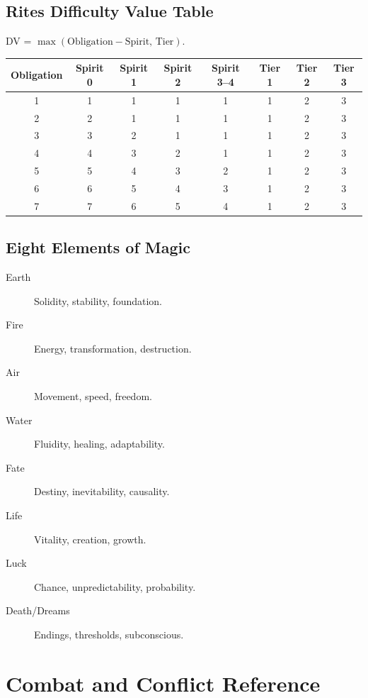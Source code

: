 \subsection{Rites Difficulty Value Table}\label{subsec:rites_dv_table}
DV = \(\max(\text{Obligation} - \text{Spirit},\, \text{Tier})\).

\begin{longtable}{c|cccc|c|c|c}
\toprule
\textbf{Obligation} & \textbf{Spirit 0} & \textbf{Spirit 1} & \textbf{Spirit 2} & \textbf{Spirit 3--4} & \textbf{Tier 1} & \textbf{Tier 2} & \textbf{Tier 3} \\
\midrule
1 & 1 & 1 & 1 & 1 & 1 & 2 & 3 \\
2 & 2 & 1 & 1 & 1 & 1 & 2 & 3 \\
3 & 3 & 2 & 1 & 1 & 1 & 2 & 3 \\
4 & 4 & 3 & 2 & 1 & 1 & 2 & 3 \\
5 & 5 & 4 & 3 & 2 & 1 & 2 & 3 \\
6 & 6 & 5 & 4 & 3 & 1 & 2 & 3 \\
7 & 7 & 6 & 5 & 4 & 1 & 2 & 3 \\
\bottomrule
\end{longtable}

\subsection{Eight Elements of Magic}\label{subsec:elements_ref}
\begin{description}
    \item[Earth] Solidity, stability, foundation.
    \item[Fire] Energy, transformation, destruction.
    \item[Air] Movement, speed, freedom.
    \item[Water] Fluidity, healing, adaptability.
    \item[Fate] Destiny, inevitability, causality.
    \item[Life] Vitality, creation, growth.
    \item[Luck] Chance, unpredictability, probability.
    \item[Death/Dreams] Endings, thresholds, subconscious.
\end{description}

\newpage
\section{Combat and Conflict Reference}\label{sec:combat_reference}

